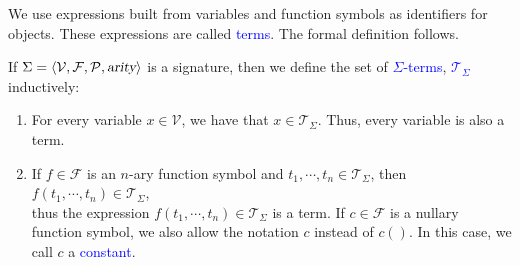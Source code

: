 \noindent
We use expressions built from variables and function symbols as identifiers for objects. These expressions are
called \textcolor{blue}{terms}. The formal definition follows.

\begin{Definition}
  If $\Sigma = \langle \mathcal{V}, \mathcal{F}, \mathcal{P}, \textsl{arity} \rangle$ is a signature, then we define the set of \textcolor{blue}{$\Sigma$-terms},
  \textcolor{blue}{$\mathcal{T}_\Sigma$}  inductively:
  \begin{enumerate}
  \item For every variable $x \in \mathcal{V}$, we have that $x \in \mathcal{T}_\Sigma$. Thus, every variable is also a term.
  \item If $f \in \mathcal{F}$ is an $n$-ary function symbol and 
        $t_1,\cdots,t_n \in \mathcal{T}_\Sigma$, then 
        \\[0.2cm]
        \hspace*{1.3cm} $f(t_1,\cdots,t_n) \in \mathcal{T}_\Sigma$,
        \\[0.2cm]
        thus the expression $f(t_1,\cdots,t_n) \in \mathcal{T}_\Sigma$ is a term.
        If $c \in \mathcal{F}$ is a nullary function symbol, we also allow the notation
        $c$ instead of $c()$. In this case, we call $c$ a \textcolor{blue}{constant}.
        \eox
  \end{enumerate}
\end{Definition}

